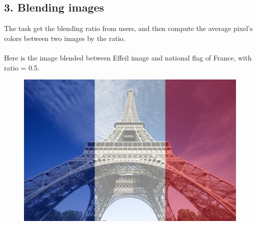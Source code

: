 \documentclass[12pt]{article}
\begin{document}
\subsection*{3. Blending images}

The task get the blending ratio from users, and then compute the average pixel's colors between two images by the ratio.
\\\\
Here is the image blended between Effeil image and national flag of France, with ratio = 0.5.

\begin{figure}[H]
  \centering
  \includegraphics[width=0.7\linewidth]{./img/6c.jpg}
\end{figure}
\end{document}

